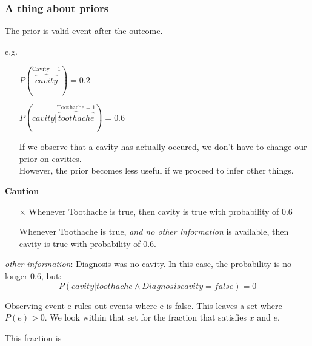 \begin{frame}\frametitle{A thing about priors}

The prior is valid event after the outcome.

e.g.\\
\begin{itemize}
 \item[] $P(\overbrace{cavity}^{\text{Cavity}=1}) = 0.2$
 \item[] $P(cavity | \overbrace{toothache}^{\text{Toothache}=1}) = 0.6$
 \item[] If we observe that a cavity has actually occured, we don't have to change our prior on cavities.\\
 However, the prior becomes less useful if we proceed to infer other things.
\end{itemize}
    
\textbf{Caution}\\
\begin{itemize}
\item[$\times$] Whenever Toothache is true, then cavity is true with probability of 0.6
\item[\checkmark] Whenever Toothache is true, \textit{and no other information} is available, then cavity is true with probability of 0.6.
\end{itemize}

\textit{other information}: Diagnosis was \underline{no} cavity. In this case, the probability is no longer 0.6, but:
\begin{equation}
P(cavity | toothache \wedge Diagnosis cavity = false) = 0
\end{equation}

\end{frame}

Observing event e rules out events where e is false. This leaves a set where $P(e)>0$.
We look within that set for the fraction that satisfies $x$ and $e$.

This fraction is


\begin{frame}
    
\end{frame}
